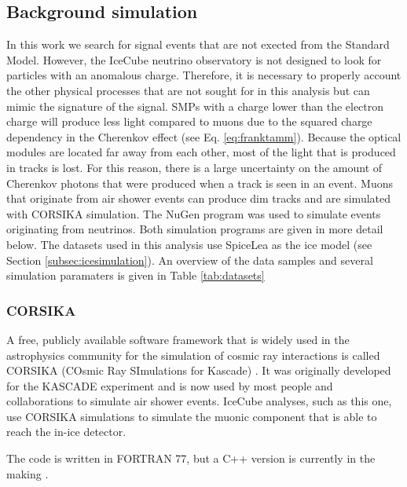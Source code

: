 \subsection{Background simulation}
In this work we search for signal events that are not exected from the Standard Model. However, the IceCube neutrino observatory is not designed to look for particles with an anomalous charge. Therefore, it is necessary to properly account the other physical processes that are not sought for in this analysis but can mimic the signature of the signal. SMPs with a charge lower than the electron charge will produce less light compared to muons due to the squared charge dependency in the Cherenkov effect (see Eq. \ref{eq:franktamm}). Because the optical modules are located far away from each other, most of the light that is produced in tracks is lost. For this reason, there is a large uncertainty on the amount of Cherenkov photons that were produced when a track is seen in an event. Muons that originate from air shower events can produce dim tracks and are simulated with CORSIKA simulation. The NuGen program was used to simulate events originating from neutrinos. Both simulation programs are given in more detail below. The datasets used in this analysis use SpiceLea as the ice model (see Section \ref{subsec:icesimulation}). An overview of the data samples and several simulation paramaters is given in Table \ref{tab:datasets}

\subsubsection{CORSIKA}
\label{subsub:corsika}
A free, publicly available software framework that is widely used in the astrophysics community for the simulation of cosmic ray interactions is called CORSIKA  (COsmic Ray SImulations for Kascade) \cite{Heck:1998vt}. It was originally developed for the KASCADE experiment and is now used by most people and collaborations to simulate air shower events. IceCube analyses, such as this one, use CORSIKA simulations to simulate the muonic component that is able to reach the in-ice detector.

The code is written in FORTRAN 77, but a C++ version is currently in the making \cite{Engel:2018akg}.\\

